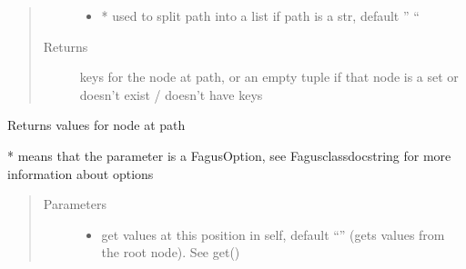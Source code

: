 \documentclass[a4paper,10pt,english]{sphinxmanual}
\begin{document}
\begin{fulllineitems}
\begin{fulllineitems}
\begin{quote}
\begin{description}
\begin{itemize}
\item {}
\sphinxAtStartPar
{} \textendash{} * used to split path into a list if path is a str, default ” “

\end{itemize}

\item[{Returns}] \leavevmode
\sphinxAtStartPar
keys for the node at path, or an empty tuple if that node is a set or doesn’t exist / doesn’t have keys

\end{description}\end{quote}

\end{fulllineitems}


\begin{fulllineitems}
\label{\detokenize{fagus.fagus:fagus.fagus.Fagus.values}}
\pysigstartsignatures
{}
\pysigstopsignatures
\sphinxAtStartPar
Returns values for node at path

\sphinxAtStartPar
* means that the parameter is a FagusOption, see Fagus\sphinxhyphen{}class\sphinxhyphen{}docstring for more information about options
\begin{quote}\begin{description}
\item[{Parameters}] \leavevmode\begin{itemize}
\item {}
\sphinxAtStartPar
{} \textendash{} get values at this position in self, default “” (gets values from the root node). See get()


\end{itemize}
\end{description}
\end{quote}
\end{fulllineitems}
\end{fulllineitems}
\end{document}
